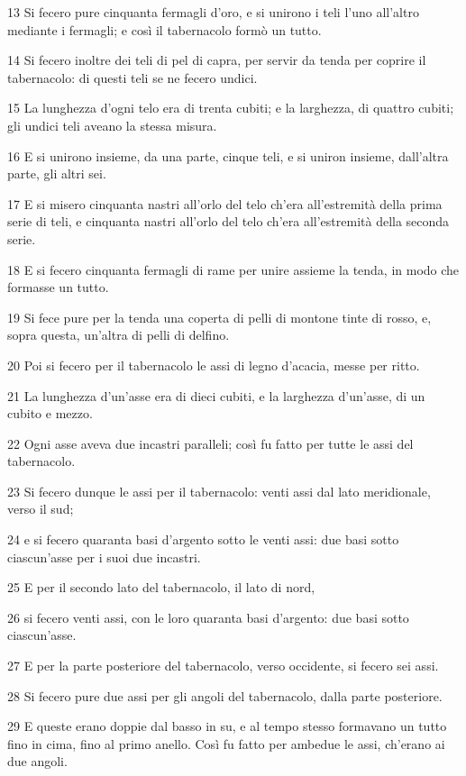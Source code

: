 \par 13 Si fecero pure cinquanta fermagli d'oro, e si unirono i teli l'uno all'altro mediante i fermagli; e così il tabernacolo formò un tutto.
\par 14 Si fecero inoltre dei teli di pel di capra, per servir da tenda per coprire il tabernacolo: di questi teli se ne fecero undici.
\par 15 La lunghezza d'ogni telo era di trenta cubiti; e la larghezza, di quattro cubiti; gli undici teli aveano la stessa misura.
\par 16 E si unirono insieme, da una parte, cinque teli, e si uniron insieme, dall'altra parte, gli altri sei.
\par 17 E si misero cinquanta nastri all'orlo del telo ch'era all'estremità della prima serie di teli, e cinquanta nastri all'orlo del telo ch'era all'estremità della seconda serie.
\par 18 E si fecero cinquanta fermagli di rame per unire assieme la tenda, in modo che formasse un tutto.
\par 19 Si fece pure per la tenda una coperta di pelli di montone tinte di rosso, e, sopra questa, un'altra di pelli di delfino.
\par 20 Poi si fecero per il tabernacolo le assi di legno d'acacia, messe per ritto.
\par 21 La lunghezza d'un'asse era di dieci cubiti, e la larghezza d'un'asse, di un cubito e mezzo.
\par 22 Ogni asse aveva due incastri paralleli; così fu fatto per tutte le assi del tabernacolo.
\par 23 Si fecero dunque le assi per il tabernacolo: venti assi dal lato meridionale, verso il sud;
\par 24 e si fecero quaranta basi d'argento sotto le venti assi: due basi sotto ciascun'asse per i suoi due incastri.
\par 25 E per il secondo lato del tabernacolo, il lato di nord,
\par 26 si fecero venti assi, con le loro quaranta basi d'argento: due basi sotto ciascun'asse.
\par 27 E per la parte posteriore del tabernacolo, verso occidente, si fecero sei assi.
\par 28 Si fecero pure due assi per gli angoli del tabernacolo, dalla parte posteriore.
\par 29 E queste erano doppie dal basso in su, e al tempo stesso formavano un tutto fino in cima, fino al primo anello. Così fu fatto per ambedue le assi, ch'erano ai due angoli.
